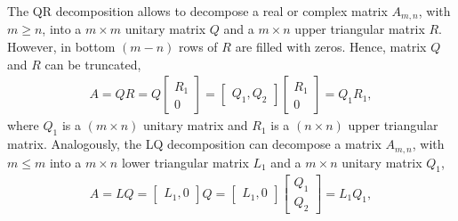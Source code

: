 The QR decomposition allows to decompose a real or complex matrix $A_{m,n}$, with $m \geq n$, into a $m \times m$ unitary matrix $Q$ and a $m \times n$ upper triangular matrix $R$. However, in bottom $(m-n)$ rows of $R$ are filled with zeros. Hence, matrix $Q$ and $R$ can be truncated,
\begin{align}
	A = QR = Q \begin{bmatrix} R_1 \\ 0 \end{bmatrix} = \begin{bmatrix} Q_1, Q_2 \end{bmatrix} \begin{bmatrix} R_1 \\ 0 \end{bmatrix} = Q_1 R_1, 
\end{align}
where $Q_1$ is a $(m \times n)$ unitary matrix and $R_1$ is a $(n \times n)$ upper triangular matrix. Analogously, the LQ decomposition can decompose a matrix $A_{m,n}$, with $m \leq m$ into a $m \times n$ lower triangular matrix $L_1$ and a $m \times n$ unitary matrix $Q_1$, 
\begin{align}
	A = LQ = \begin{bmatrix} L_1, 0 \end{bmatrix} Q = \begin{bmatrix}  L_1, 0\end{bmatrix} \begin{bmatrix} Q_1 \\ Q_2 \end{bmatrix} = L_1 Q_1, 
\end{align}


